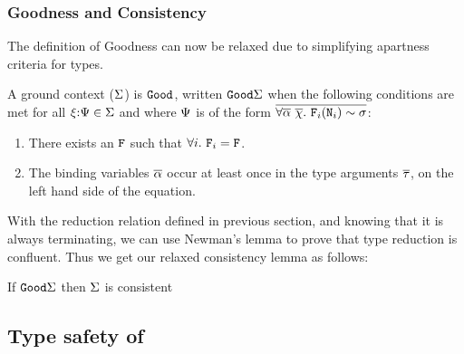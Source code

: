 \documentclass[format=acmsmall,manuscript,review,screen,nonacm,margin=1in,11pt]{acmart}
\begin{document}
\subsubsection{Goodness and Consistency}\label{subsubsec:tf-constrained-goodness-consistency}
The definition of Goodness can now be relaxed due to simplifying apartness criteria for types.
\begin{property}
  A ground context ($\Sigma$) is $\texttt{Good}$, written $\texttt{Good}\Sigma$ when
  the following conditions are met for all $\xi{:}\Psi\in\Sigma$ and
  where $\Psi$ is of the form $\overline{\forall\overline{\alpha}~\overline{\chi}.~\texttt{F}_i(\texttt{N}_i)\mathrel{\sim}\sigma}$:
  \begin{enumerate}
  \item There exists an $\texttt{F}$ such that  $\forall i.~\texttt{F}_i = \texttt{F}$.
  \item The binding variables $\overline{\alpha}$ occur at least once in the type arguments $\overline{\tau}$,
    on the left hand side of the equation.
  \end{enumerate}
\end{property}
With the reduction relation defined in previous section, and knowing that it is always terminating,
we can use Newman's lemma\cite{newman_theories_1942} to prove that type reduction is confluent.
Thus we get our relaxed consistency lemma as follows:
\begin{lemma}[Consistency] If $\texttt{Good}\Sigma$ then $\Sigma$ is consistent \end{lemma}

\subsection{Type safety of \QLTF}\label{subsec:tf-constrained-safety} 
\newcommand\TQPush{
  \ib{\irule[\trule{t-qpush}]
    {\substack {{v = \Lam c \Preds \Tm}\\
        {\MoreCo_0 = \nth 0 \MoreCo}}}
    {\substack {{\MoreCo_1 = \sym{\nth 1 \MoreCo}}\\
        {\MoreCo_2 = \nth 2 \MoreCo}}};
    {\stepsto {(\cast v \MoreCo)\App \Co} {\cast {v\App(\comp{\comp{\MoreCo_0}{\Co}}{\MoreCo_1})} \MoreCo_2}}
  }
  }

\newcommand\TQResolve{
  \ib{\irule[\trule{t-qres}]
    {\chi = (\alpha|c\co\FamCtrs(\many\tau)\teq\alpha)}
    {\FamCtrs(\many\tau) \Downarrow q};
    {\stepsto {\tassume\chi\Tm} {e[\chi/q]}}}
}
\end{document}
